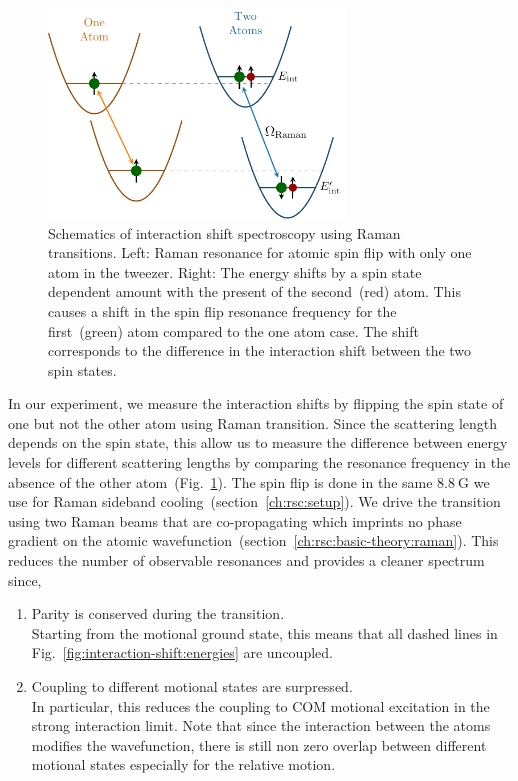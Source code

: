 \begin{figure}
  \centering
  \includegraphics[width=0.7\textwidth]{figures/interaction_shift_measure.pdf}
  \caption[Schematics of interaction shift spectroscopy.]{
    Schematics of interaction shift spectroscopy using Raman transitions.
    Left: Raman resonance for atomic spin flip with only one atom in the tweezer.
    Right: The energy shifts by a spin state dependent amount with the present of
    the second~(red) atom. This causes a shift in the spin flip resonance frequency
    for the first~(green) atom compared to the one atom case.
    The shift corresponds to the difference in the interaction shift between the
    two spin states.
    \label{fig:interaction-shift:measure}}
\end{figure}

In our experiment, we measure the interaction shifts by flipping the spin state of
one but not the other atom using Raman transition.
Since the scattering length depends on the spin state,
this allow us to measure the difference between energy levels for different scattering lengths
by comparing the resonance frequency in the absence of
the other atom~(Fig.~\ref{fig:interaction-shift:measure}).
The spin flip is done in the same $8.8~\mathrm{G}$ we use for
Raman sideband cooling~(section~\ref{ch:rsc:setup}).
We drive the transition using two Raman beams that are co-propagating
which imprints no phase gradient on
the atomic wavefunction~(section~\ref{ch:rsc:basic-theory:raman}).
This reduces the number of observable resonances and provides a cleaner spectrum since,
\begin{enumerate}
\item Parity is conserved during the transition.\\
  Starting from the motional ground state, this means that all dashed lines in
  Fig.~\ref{fig:interaction-shift:energies} are uncoupled.
\item Coupling to different motional states are surpressed.\\
  In particular, this reduces the coupling to COM motional excitation
  in the strong interaction limit.
  Note that since the interaction between the atoms modifies the wavefunction,
  there is still non zero overlap between different motional states
  especially for the relative motion.
\end{enumerate}

